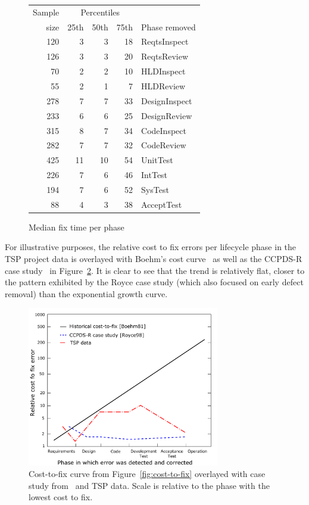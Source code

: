 \documentclass{sig-alternate}
\newcommand{\fig}[1]{Figure~\ref{fig:#1}}
\begin{document}
\begin{figure}[!ht]
\begin{center}
\begin{tabular}{r|rrr|l}
  Sample&\multicolumn{3}{c|}{Percentiles}\\ 
size & 25th & 50th & 75th & Phase removed \\
\hline
120 & 3 & 3 & 18 & ReqtsInspect \\
126 & 3 & 3 & 20 & ReqtsReview \\
70 & 2 & 2 & 10 & HLDInspect \\
 55 &    2 &    1&    7&HLDReview \\

278&    7&    7&   33&DesignInspect \\
233&    6&    6&   25&DesignReview \\

315&    8&    7&   34&CodeInspect \\ 
282&    7&    7&   32&CodeReview\\ 

425&   11&   10&   54&UnitTest \\ 
226&    7&    6&   46&IntTest \\ 
194&    7&    6&   52&SysTest\\ 
 88&    4&    3&   38&AcceptTest\\
\end{tabular}
\end{center}
\caption{Median fix time per phase}
\label{fig:fix-time-per-phase}
\end{figure}


For illustrative purposes, the relative cost to fix errors per lifecycle phase in the TSP project data is overlayed with Boehm's cost curve~\cite{Boehm81} as well as the CCPDS-R case study~\cite{Royce98} in \fig{cost-to-fix-tsp}. It is clear to see that the trend is relatively flat, closer to the pattern exhibited by the Royce case study (which also focused on early defect removal) than the exponential growth curve.

\begin{figure}[!ht]
 \includegraphics[width=3.3in]{boehm-overlay.pdf}
 \caption{Cost-to-fix curve from \fig{cost-to-fix} overlayed with case study from~\cite{Royce98} and TSP data. Scale is relative to the phase with the lowest cost to fix. }
 \label{fig:cost-to-fix-tsp}
 \end{figure}
 
\end{document}
